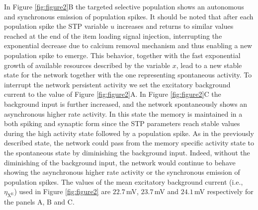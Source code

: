 \documentclass[a4paper, 12pt, twoside, openright]{book}
\begin{document}
In Figure \ref{fig:figure2}B the targeted selective population shows an autonomous and synchronous emission of population spikes. It should be noted that after each population spike the STP variable $u$ increases and returns to similar values reached at the end of the item loading signal injection, interrupting the exponential decrease due to calcium removal mechanism and thus enabling a new population spike to emerge. This behavior, together with the fast exponential growth of available resources described by the variable $x$, lead to a new stable state for the network together with the one representing spontaneous activity. To interrupt the network persistent activity we set the excitatory background current to the value of Figure \ref{fig:figure2}A. In Figure \ref{fig:figure2}C the background input is further increased, and the network spontaneously shows an asynchronous higher rate activity. In this state the memory is maintained in a both spiking and synaptic form since the STP parameters reach stable values during the high activity state followed by a population spike. 
As in the previously described state, the network could pass from the memory specific activity state to the spontaneous state by diminishing the background input. Indeed, without the diminishing of the background input, the network would continue to behave showing the asynchronous higher rate activity or the synchronous emission of population spikes. The values of the mean excitatory background current (i.e., $\eta_{\text{X}^{\text{E}}}$) used in Figure \ref{fig:figure2} are $22.7$\,mV, $23.7$\,mV and $24.1$\,mV  respectively for the panels A, B and C.
\end{document}
